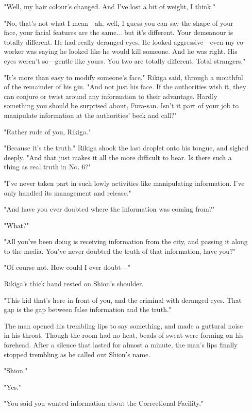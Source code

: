 "Well, my hair colour's changed. And I've lost a bit of weight, I
think."

"No, that's not what I mean---ah, well, I guess you can say the shape of
your face, your facial features are the same... but it's different. Your
demeanour is totally different. He had really deranged eyes. He looked
aggressive---even my co-worker was saying he looked like he would kill
someone. And he was right. His eyes weren't so---gentle like yours. You
two are totally different. Total strangers."

"It's more than easy to modify someone's face," Rikiga said, through a
mouthful of the remainder of his gin. "And not just his face. If the
authorities wish it, they can conjure or twist around any information to
their advantage. Hardly something you should be surprised about,
Fura-san. Isn't it part of your job to manipulate information at the
authorities' beck and call?"

"Rather rude of you, Rikiga."

"Because it's the truth." Rikiga shook the last droplet onto his tongue,
and sighed deeply. "And that just makes it all the more difficult to
bear. Is there such a thing as real truth in No. 6?"

"I've never taken part in such lowly activities like manipulating
information. I've only handled its management and release."

"And have you ever doubted where the information was coming from?"

"What?"

"All you've been doing is receiving information from the city, and
passing it along to the media. You've never doubted the truth of that
information, have you?"

"Of course not. How could I ever doubt---"

Rikiga's thick hand rested on Shion's shoulder.

"This kid that's here in front of you, and the criminal with deranged
eyes. That gap is the gap between false information and the truth."

The man opened his trembling lips to say something, and made a guttural
noise in his throat. Though the room had no heat, beads of sweat were
forming on his forehead. After a silence that lasted for almost a
minute, the man's lips finally stopped trembling as he called out
Shion's name.

"Shion."

"Yes."

"You said you wanted information about the Correctional Facility."

